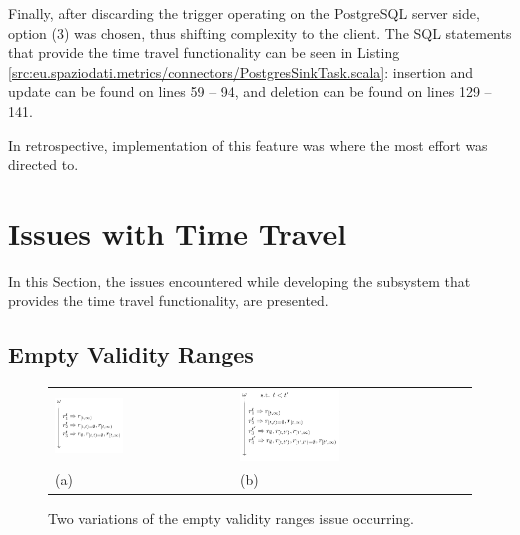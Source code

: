 Finally, after discarding the trigger operating on the PostgreSQL server side, option (3) was chosen, thus shifting complexity to the client.
The SQL statements that provide the time travel functionality can be seen in Listing \ref{src:eu.spaziodati.metrics/connectors/PostgresSinkTask.scala}: insertion and update can be found on lines 59 -- 94, and deletion can be found on lines 129 -- 141.

In retrospective, implementation of this feature was where the most effort was directed to.


\section{Issues with Time Travel}

In this Section, the issues encountered while developing the subsystem that provides the time travel functionality, are presented.


\subsection{Empty Validity Ranges}
\label{sec:tt-empty-ranges}

\begin{figure}
	\centering
	\begin{tabular}{p{} p{}}
		\vspace{0pt} \includegraphics[width=0.4\textwidth]{figures/time-travel/empty-ranges} &
		\vspace{0pt} \includegraphics[width=0.44\textwidth]{figures/time-travel/empty-ranges-2} \\
		(a) & (b)
	\end{tabular}
	\caption{Two variations of the empty validity ranges issue occurring.}
	\label{fig:empty-ranges}
\end{figure}

